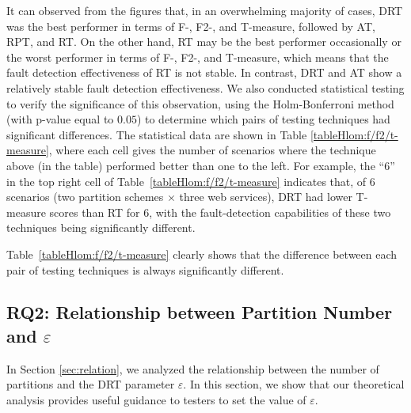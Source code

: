 \documentclass[10pt,journal,compsoc]{IEEEtran}
\begin{document}
It can observed from the figures that, in an overwhelming majority of cases, DRT was the best performer in terms of F-, F2-, and T-measure, followed by AT, RPT, and RT. On the other hand, RT may be the best performer occasionally or the worst performer in terms of F-, F2-, and T-measure, which means that the fault detection effectiveness of RT is not stable. In contrast, DRT and AT show a relatively stable fault detection effectiveness.
We also conducted statistical testing to verify the significance of this observation, using the Holm-Bonferroni method~\cite{sun2018adaptive} (with p-value equal to $0.05$) to determine which pairs of testing techniques had significant differences.
The statistical data are shown in Table \ref{tableHlom:f/f2/t-measure}, where each cell gives the number of scenarios where the technique above (in the table) performed better than one to the left.
For example, the ``6'' in the top right cell of Table~\ref{tableHlom:f/f2/t-measure} indicates that, of 6 scenarios (two partition schemes $\times$ three web services), DRT had lower T-measure scores than RT for 6, with the fault-detection capabilities of these two techniques being significantly different.

Table~\ref{tableHlom:f/f2/t-measure} clearly shows that the difference between each pair of testing techniques is always significantly different.

\subsection{RQ2: Relationship between Partition Number and $\varepsilon$}
\label{sec:RQ2}

In Section \ref{sec:relation}, we analyzed the relationship between the number of partitions and the DRT parameter $\varepsilon$.
In this section, we show that our theoretical analysis provides useful guidance to testers to set the value of $\varepsilon$.
\end{document}
